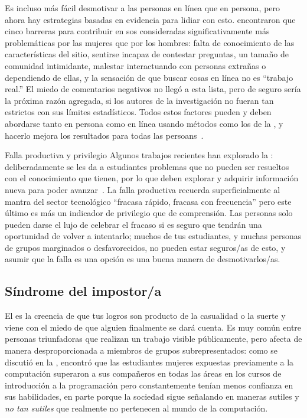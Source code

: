 Es incluso más fácil desmotivar a las personas en línea que en persona,
pero ahora hay estrategias basadas en evidencia para lidiar con esto.
\cite{Ford2016} encontraron que cinco barreras para contribuir en 
sos consideradas significativamente más problemáticas por las mujeres que por los hombres:
falta de conocimiento de las características del sitio,
sentirse incapaz de contestar preguntas,
un tamaño de comunidad intimidante,
malestar interactuando con personas extrañas o dependiendo de ellas,
y la sensación de que buscar cosas en línea no es ``trabajo real.''
El miedo de comentarios negativos no llegó a esta lista,
pero de seguro sería la próxima razón agregada, si los autores de la investigación no fueran tan estrictos con sus límites estadísticos.
Todos estos factores pueden y deben abordarse tanto en persona como en línea
usando métodos como los de la ,
y hacerlo mejora los resultados para todas las persoans~\cite{Sved2016}.

\begin{aside}{Falla productiva y privilegio}
  Algunos trabajos recientes han explorado la : 
  deliberadamente se les da a estudiantes problemas que no pueden ser resueltos con el conocimiento que tienen, por lo que
  deben explorar y adquirir información nueva para poder avanzar~\cite{Kapu2016}.
    La falla productiva recuerda superficialmente al mantra del sector tecnológico ``fracasa rápido, fracasa con frecuencia''
    pero este último es más un indicador de privilegio que de comprensión.
    Las personas solo pueden darse el lujo de celebrar el fracaso si es seguro que tendrán una oportunidad de volver a intentarlo;
    muchos de tus estudiantes,
    y muchas personas de grupos marginados o desfavorecidos,
    no pueden estar seguros/as de esto,
    y asumir que la falla es una opción es una buena manera de desmotivarlos/as.
\end{aside}

\subsection*{Síndrome del impostor/a}

El 
es la creencia de que tus logros son producto de la casualidad o la suerte
y viene con el miedo de que alguien finalmente se dará cuenta.
Es muy común entre personas triunfadoras que realizan un trabajo visible públicamente,
pero afecta de manera desproporcionada a miembros de grupos subrepresentados:
como se discutió en la ,
\cite{Wilc2018} encontró que
las estudiantes mujeres expuestas previamente a la computación superaron a sus compañeros en todas las áreas en los cursos de introducción a la programación
pero constantemente tenían menos confianza en sus habilidades,
en parte porque la sociedad sigue señalando en maneras sutiles y \emph{no tan sutiles}
que realmente no pertenecen al mundo de la computación.

